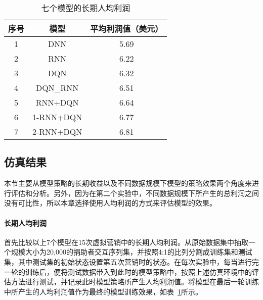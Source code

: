   \begin{table}[htbp]
  \centering
  \caption{七个模型的长期人均利润}
  \label{tab:4result0}
  \begin{tabular}{c|cc}  
    \toprule
      序号 &模型 & 平均利润值（美元） \\
    \midrule
      1 & DNN & 5.69\\
      2 & RNN & 6.22\\
      3 & DQN & 6.32\\
      4 & DQN_RNN & 6.51\\
      5 & RNN+DQN & 6.64\\
      6 & 1-RNN+DQN & 6.77\\
      7 & 2-RNN+DQN & 6.81 \\           
    \bottomrule
  \end{tabular}
\end{table}

\subsection{仿真结果}
本节主要从模型策略的长期收益以及不同数据规模下模型的策略效果两个角度来进行评估和分析。另外，因为在第二个实验中，不同数据规模下所产生的总利润之间没有可比性，所以本章选择使用人均利润的方式来评估模型的效果。

\paragraph{长期人均利润}
首先比较以上7个模型在15次虚拟营销中的长期人均利润。从原始数据集中抽取一个规模大小为20,000的捐助者交互序列集，并按照4:1的比列分割成训练集和测试集，其中测试集的初始状态设置第五次营销时的状态。在每次实验中，每当进行完一轮的训练后，便将测试数据带入到此时的模型策略中，按照上述仿真环境中的评估方法进行测试，并记录此时模型策略所产生人均利润值。将模型在最后一轮训练中所产生的人均利润值作为最终的模型训练效果，如表~\ref{tab:4result0}所示。

